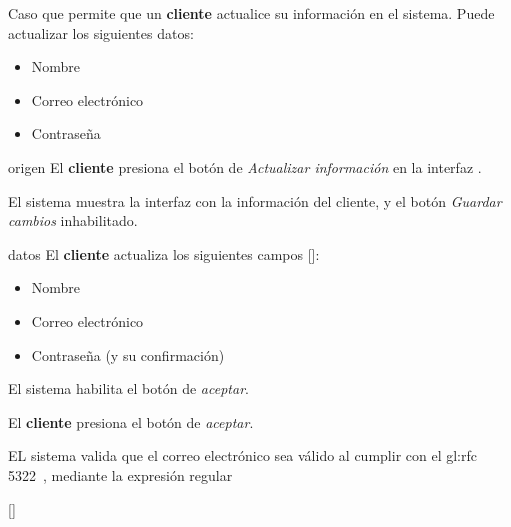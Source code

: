 %
%

{
  Caso que permite que un \textbf{cliente} actualice su información en el
  sistema. Puede actualizar los siguientes datos:
  \begin{itemize}
    \item Nombre
    \item Correo electrónico
    \item Contraseña
  \end{itemize}

  \begin{trayectoriaPrincipal}

    \item[origen] El \textbf{cliente} presiona el botón de
      \textit{Actualizar información} en la interfaz
      .

    \item El sistema muestra la interfaz
       con la información
      del cliente, y el botón \textit{Guardar cambios} inhabilitado.

    \item[datos] El \textbf{cliente} actualiza los siguientes campos
      []:
      \begin{itemize}
        \item Nombre
        \item Correo electrónico
        \item Contraseña (y su confirmación)
      \end{itemize}

    \item El sistema habilita el botón de \textit{aceptar}.

    \item El \textbf{cliente} presiona el botón de \textit{aceptar}.

    \item EL sistema valida que el correo electrónico sea válido
      al cumplir con el \gls{gl:rfc}
      5322~\cite{DBLP:journals/rfc/rfc5322}, mediante la expresión
      regular


      []


\end{trayectoriaPrincipal}}
